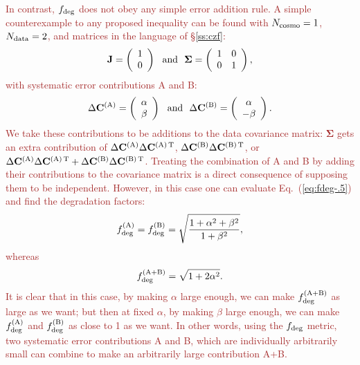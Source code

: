 \documentclass[usenatbib]{mnras}
\newcommand{\changetext}[1]{\textcolor{brown}{#1}}
\begin{document}
\changetext{In contrast, $f_{\rm deg}$ does not obey any simple error addition rule. A simple counterexample to any proposed inequality can be found with $N_{\rm cosmo}=1$, $N_{\rm data}=2$, and matrices in the language of \S\ref{ss:czf}:
\begin{equation}
{\bf J} = \left( \begin{array}c 1 \\ 0 \end{array} \right) ~~{\rm and}~~
{\boldsymbol\Sigma} = \left( \begin{array}{cc} 1 & 0 \\ 0 & 1 \end{array} \right),
\end{equation}
with systematic error contributions A and B:
\begin{equation}
\Delta{\bf C}^{(\rm A)} =  \left( \begin{array}c \alpha \\ \beta \end{array} \right) ~~{\rm and}~~
\Delta{\bf C}^{(\rm B)} =  \left( \begin{array}c \alpha \\ -\beta \end{array} \right).
\end{equation}
We take these contributions to be additions to the data covariance matrix: ${\boldsymbol\Sigma}$ gets an extra contribution of $\Delta{\bf C}^{(\rm A)}\Delta{\bf C}^{(\rm A)\,T}$, $\Delta{\bf C}^{(\rm B)}\Delta{\bf C}^{(\rm B)\,T}$, or $\Delta{\bf C}^{(\rm A)}\Delta{\bf C}^{(\rm A)\,T} + \Delta{\bf C}^{(\rm B)}\Delta{\bf C}^{(\rm B)\,T}$. Treating the combination of A and B by adding their contributions to the covariance matrix is a direct consequence of supposing them to be independent. However, in this case one can evaluate Eq.~(\ref{eq:fdeg-.5}) and find the degradation factors:
\begin{equation}
f_{\rm deg}^{(\rm A)} = f_{\rm deg}^{(\rm B)} = \sqrt{\frac{ 1 + \alpha^2 + \beta^2 }{ 1 + \beta^2 }},
\end{equation}
whereas
\begin{equation}
f_{\rm deg}^{(\rm A+B)} = \sqrt{1 + 2\alpha^2}.
\end{equation}
It is clear that in this case, by making $\alpha$ large enough, we can make $f_{\rm deg}^{(\rm A+B)}$ as large as we want; but then at fixed $\alpha$, by making $\beta$ large enough, we can make $f_{\rm deg}^{(\rm A)}$ and $f_{\rm deg}^{(\rm B)}$ as close to 1 as we want. In other words, using the $f_{\rm deg}$ metric, two systematic error contributions A and B, which are individually arbitrarily small can combine to make an arbitrarily large contribution A+B.}
\end{document}
